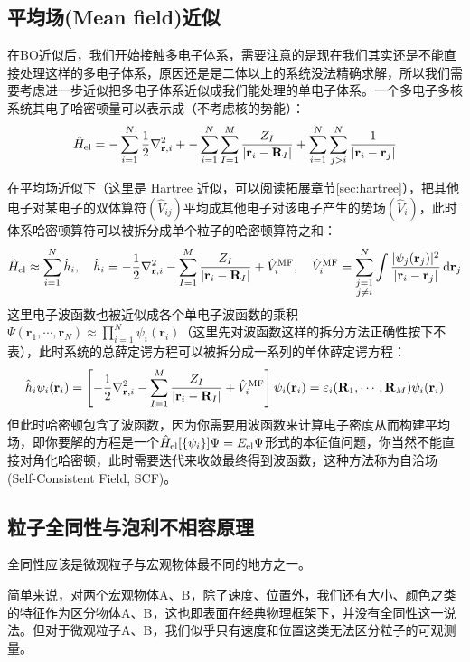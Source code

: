 \newpage
\subsection{平均场(Mean field)近似}
在BO近似后，我们开始接触多电子体系，需要注意的是现在我们其实还是不能直接处理这样的多电子体系，原因还是是二体以上的系统没法精确求解，所以我们需要考虑进一步近似把多电子体系近似成我们能处理的单电子体系。一个多电子多核系统其电子哈密顿量可以表示成（不考虑核的势能）：
\[\hat{H}_{\rm el}=-\sum_{i=1}^N\frac{1}{2}\nabla^2_{\mathbf{r},i}+-\sum_{i=1}^{N}\sum_{I=1}^{M}\frac{Z_{I}}{|\mathbf{r}_{i}-\mathbf{R}_{I}|}+\sum_{i=1}^{N}\sum_{j>i}^{N}\frac{1}{|\mathbf{r}_{i}-\mathbf{r}_{j}|}\]

在平均场近似下（这里是 Hartree 近似，可以阅读拓展章节\ref{sec:hartree}），把其他电子对某电子的双体算符$(\hat{V}_{ij})$平均成其他电子对该电子产生的势场$(\hat{V}_{i})$，此时体系哈密顿算符可以被拆分成单个粒子的哈密顿算符之和：
\[\hat{H}_{\rm el}\approx \sum_{i=1}^{N}\hat{h}_{i}, \quad \hat{h}_i=-\frac{1}{2}\nabla^2_{\mathbf{r},i}-\sum_{I=1}^{M}\frac{Z_I}{|\mathbf{r}_{i}-\mathbf{R}_{I}|}+\hat{V}^{\rm MF}_i, \quad \hat{V}^{\rm MF}_i=\sum_{\substack{j=1\\j\ne i}}^{N}\int\frac{|\psi_j(\mathbf{r}_j)|^2}{|\mathbf{r}_i-\mathbf{r}_j|}\dd{\mathbf{r}_j}\]
这里电子波函数也被近似成各个单电子波函数的乘积$\Psi(\mathbf{r}_1,\cdots,\mathbf{r}_N)\approx\prod_{i=1}^{N}\psi_i(\mathbf{r}_i)$（这里先对波函数这样的拆分方法正确性按下不表），此时系统的总薛定谔方程可以被拆分成一系列的单体薛定谔方程：
\[\hat{h}_i\psi_i(\mathbf{r}_i)=\left[-\frac{1}{2}\nabla^2_{\mathbf{r},i}-\sum_{I=1}^{M}\frac{Z_I}{|\mathbf{r}_{i}-\mathbf{R}_{I}|}+\hat{V}^{\rm MF}_i\right]\psi_i(\mathbf{r}_i)=\varepsilon_i(\mathbf{R}_1,\cdots,\mathbf{R}_M)\psi_i(\mathbf{r}_i)\]
但此时哈密顿包含了波函数，因为你需要用波函数来计算电子密度从而构建平均场，即你要解的方程是一个$\hat{H}_{\rm el}[\{\psi_i\}]\Psi=E_{\rm el}\Psi$形式的本征值问题，你当然不能直接对角化哈密顿，此时需要迭代来收敛最终得到波函数，这种方法称为自洽场(Self-Consistent Field, SCF)。

\subsection{粒子全同性与泡利不相容原理}\label{sec:particle_identity}
全同性应该是微观粒子与宏观物体最不同的地方之一。

简单来说，对两个宏观物体A、B，除了速度、位置外，我们还有大小、颜色之类的特征作为区分物体A、B，这也即表面在经典物理框架下，并没有全同性这一说法。但对于微观粒子A、B，我们似乎只有速度和位置这类无法区分粒子的可观测量。


